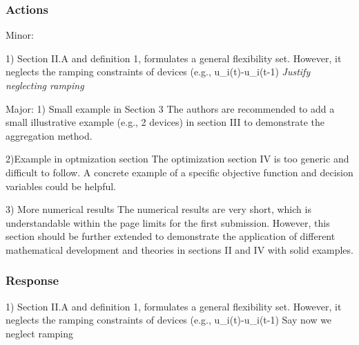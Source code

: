 \subsubsection{Actions}
Minor:

1) Section II.A and definition 1, formulates a general flexibility set. However, it neglects the ramping constraints of devices (e.g., u_i(t)-u_i(t-1) 
\textit{Justify neglecting ramping}





Major:
1)
Small example in Section 3
The authors are recommended to add a small illustrative example (e.g., 2 devices) in section III to demonstrate the aggregation method.


2)Example in optmization section
The optimization section IV is too generic and difficult to follow. A concrete example of a specific objective function and decision variables could be helpful.

3) More numerical results
The numerical results are very short, which is understandable within the page limits for the first submission. However, this section should be further extended to demonstrate the application of different mathematical development and theories in sections II and IV with solid examples.




\subsubsection{Response}
1) Section II.A and definition 1, formulates a general flexibility set. However, it neglects the ramping constraints of devices (e.g., u_i(t)-u_i(t-1) 
Say now we neglect ramping